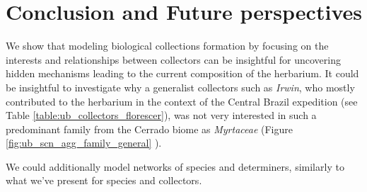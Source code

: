 \chapter{Conclusion and Future perspectives}\label{conclusion_perspectives}





We show that modeling biological collections formation by focusing on the interests and relationships between collectors can be insightful for uncovering hidden mechanisms leading to the current composition of the herbarium. 
It could be insightful to investigate why a generalist collectors such as \textit{Irwin}, who mostly contributed to the herbarium in the context of the Central Brazil expedition (see Table \ref{table:ub_collectors_florescer}), was not very interested in such a predominant family from the Cerrado biome as \textit{Myrtaceae} (Figure \ref{fig:ub_scn_agg_family_general} ).


We could additionally model networks of species and determiners, similarly to what we've present for species and collectors.












